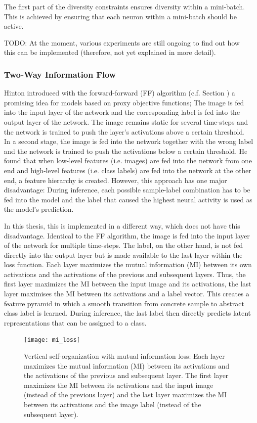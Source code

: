 The first part of the diversity constraints ensures diversity within a mini-batch. This is achieved by ensuring that each neuron within a mini-batch should be active. 

TODO: At the moment, various experiments are still ongoing to find out how this can be implemented (therefore, not yet explained in more detail).


\subsubsection{Two-Way Information Flow}
Hinton  introduced with the forward-forward (FF) algorithm (c.f. Section ) a promising idea for models based on proxy objective functions; 
The image is fed into the input layer of the network and the corresponding label is fed into the output layer of the network. The image remains static for several time-steps and the network is trained to push the layer's activations above a certain threshold. In a second stage, the image is fed into the network together with the wrong label and the network is trained to push the activations below a certain threshold. He found that when low-level features (i.e. images) are fed into the network from one end and high-level features (i.e. class labels) are fed into the network at the other end, a feature hierarchy is created. However, this approach has one major disadvantage: During inference, each possible sample-label combination has to be fed into the model and the label that caused the highest neural activity is used as the model's prediction.

In this thesis, this is implemented in a different way, which does not have this disadvantage. Identical to the FF algorithm, the image is fed into the input layer of the network for multiple time-steps. The label, on the other hand, is not fed directly into the output layer but is made available to the last layer within the loss function. Each layer maximizes the mutual information (MI) between its own activations and the activations of the previous and subsequent layers. Thus, the first layer maximizes the MI between the input image and its activations, the last layer maximises the MI between its activations and a label vector. This creates a feature pyramid in which a smooth transition from concrete sample to abstract class label is learned. During inference, the last label then directly predicts latent representations that can be assigned to a class.

\begin{figure}[h]
    \centering
    \texttt{[image: mi\_loss]}
    \caption[Vertical self-organization with mutual information loss]{Vertical self-organization with mutual information loss: Each layer maximizes the mutual information (MI) between its activations and the activations of the previous and subsequent layer. The first layer maximizes the MI between its activations and the input image (instead of the previous layer) and the last layer maximizes the MI between its activations and the image label (instead of the subsequent layer).}
\end{figure}

